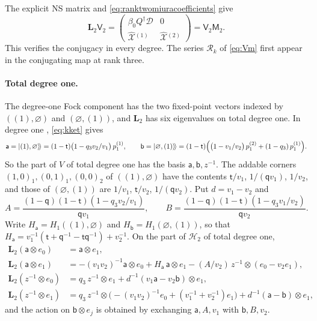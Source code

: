\documentclass[11pt]{amsart}
\theoremstyle{definition}
\theoremstyle{remark}
\newcommand{\Mq}{\mathsf q}                      %
\newcommand{\Mt}{\mathsf t}                      %
\newcommand{\betaz}{\beta_0}                     %
\newcommand{\Cartan}[1]{H_{#1}}                  %
\newcommand{\bx}[3]{(#1,#2)_{#3}}                %
\newcommand{\HH}{\mathcal H}
\newcommand{\Hsp}[1]{\HH_{#1}}                   %
\newcommand{\auxe}[1]{e_{#1}}                    %
\newcommand{\kket}[1]{\lvert #1\rangle\!\rangle} %
\newcommand{\pk}[2]{p_{#1}^{(#2)}}               %
\newcommand{\LL}{\mathbf L}
\newcommand{\Lax}[1]{\LL_{#1}}                   %
\newcommand{\DD}{\mathcal D}
\newcommand{\Xhat}[1]{\widehat{\mathcal X}{}^{(#1)}}   %
\newcommand{\MM}{\mathsf M}
\newcommand{\Miura}[1]{\MM_{#1}}                 %
\newcommand{\VV}{\mathsf V}
\newcommand{\Vconj}[1]{\VV_{#1}}                 %
\newcommand{\Rlast}[1]{\mathcal R_{#1}}          %
\newcommand{\Qan}{Q^\dagger}                     %
\begin{document}
The explicit NS matrix and \eqref{eq:ranktwomiuracoefficients} give
\[
 \Lax{2}\Vconj{2}
 =\begin{pmatrix}\betaz\Qan\DD&0\\\Xhat{1}&\Xhat{2}\end{pmatrix}
 =\Vconj{2}\Miura{2}.
\]
This verifies the conjugacy in every degree. The series \(\Rlast{k}\) of
\eqref{eq:Vm} first appear in the conjugating map at rank three.

\paragraph{Total degree one.}
The degree-one Fock component has the two fixed-point vectors
indexed by \(((1),\varnothing)\) and \((\varnothing,(1))\), and
\(\Lax{2}\) has six eigenvalues on total degree one.
In degree one \cite[Section~3.1]{BCS}, \eqref{eq:kket} gives
\[
 \mathsf a=\kket{(1),\varnothing}=(1-\Mt)\bigl(1-q_3v_2/v_1\bigr)\,\pk{1}{1},\qquad
 \mathsf b=\kket{\varnothing,(1)}=(1-\Mt)\Bigl(\bigl(1-v_1/v_2\bigr)\,\pk{1}{2}+(1-q_3)\,\pk{1}{1}\Bigr).
\]
So the part of \(V\) of total degree one has the basis \(\mathsf a,\mathsf b,z^{-1}\). The addable corners
\(\bx{1}{0}{1},\bx{0}{1}{1},\bx{0}{0}{2}\) of \(((1),\varnothing)\) have the contents \(\Mt/v_1\), \(1/(\Mq v_1)\),
\(1/v_2\), and those of \((\varnothing,(1))\) are \(1/v_1\), \(\Mt/v_2\), \(1/(\Mq v_2)\). Put \(d=v_1-v_2\) and
\[
 A=\frac{(1-\Mq)(1-\Mt)(1-q_3v_2/v_1)}{\Mq v_1},\qquad
 B=\frac{(1-\Mq)(1-\Mt)(1-q_3v_1/v_2)}{\Mq v_2}.
\]
Write \(H_{\mathsf a}=\Cartan{1}((1),\varnothing)\) and \(H_{\mathsf b}=\Cartan{1}(\varnothing,(1))\), so that
\(H_{\mathsf a}=v_1^{-1}(\Mt+\Mq^{-1}-\Mt\Mq^{-1})+v_2^{-1}\). On the part of \(\Hsp{2}\) of total degree one,
\begin{align*}
 \Lax{2}(\mathsf a\otimes\auxe{0})&=\mathsf a\otimes\auxe{1},\\
 \Lax{2}(\mathsf a\otimes\auxe{1})&=-(v_1v_2)^{-1}\mathsf a\otimes\auxe{0}+H_{\mathsf a}\,\mathsf a\otimes\auxe{1}
 -(A/v_2)\,z^{-1}\otimes(\auxe{0}-v_2\auxe{1}),\\
 \Lax{2}(z^{-1}\otimes\auxe{0})&=q_3\,z^{-1}\otimes\auxe{1}+d^{-1}(v_1\mathsf a-v_2\mathsf b)\otimes\auxe{1},\\
 \Lax{2}(z^{-1}\otimes\auxe{1})&=q_3\,z^{-1}\otimes\bigl(-(v_1v_2)^{-1}\auxe{0}+(v_1^{-1}+v_2^{-1})\auxe{1}\bigr)
 +d^{-1}(\mathsf a-\mathsf b)\otimes\auxe{1},
\end{align*}
and the action on \(\mathsf b\otimes\auxe{j}\) is obtained by exchanging
\(\mathsf a,A,v_1\) with \(\mathsf b,B,v_2\).
\end{document}
